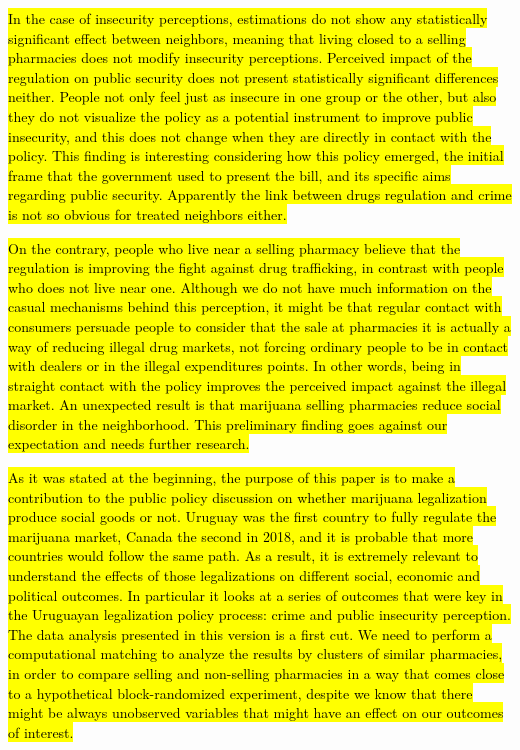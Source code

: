\documentclass[11pt]{article}
\begin{document}
\hl{In the case of insecurity perceptions, estimations do not show any statistically significant effect between neighbors, meaning that living closed to a selling pharmacies does not modify insecurity perceptions. Perceived impact of the regulation on public security does not present statistically significant differences neither. People not only feel just as insecure in one group or the other, but also they do not visualize the policy as a potential instrument to improve public insecurity, and this does not change when they are directly in contact with the policy. This finding is interesting considering how this policy emerged, the initial frame that the government used to present the bill, and its specific aims regarding public security. Apparently the link between drugs regulation and crime is not so obvious for treated neighbors either.}

\hl{On the contrary, people who live near a selling pharmacy believe that the regulation is improving the fight against drug trafficking, in contrast with people who does not live near one. Although we do not have much information on the casual mechanisms behind this perception, it might be that regular contact with consumers persuade people to consider that the sale at pharmacies it is actually a way of reducing illegal drug markets, not forcing ordinary people to be in contact with dealers or in the illegal expenditures points. In other words, being in straight contact with the policy improves the perceived impact against the illegal market. An unexpected result is that marijuana selling pharmacies reduce social disorder in the neighborhood. This preliminary finding goes against our expectation and needs further research.}

\hl{As it was stated at the beginning, the purpose of this paper is to make a contribution to the public policy discussion on whether marijuana legalization produce social goods or not. Uruguay was the first country to fully regulate the marijuana market, Canada the second in 2018, and it is probable that more countries would follow the same path. As a result, it is extremely relevant to understand the effects of those legalizations on different social, economic and political outcomes. In particular it looks at a series of outcomes that were key in the Uruguayan legalization policy process: crime and public insecurity perception. The data analysis presented in this version is a first cut. We need to perform a computational matching to analyze the results by clusters of similar pharmacies, in order to compare selling and non-selling pharmacies in a way that comes close to a hypothetical block-randomized experiment, despite we know that there might be always unobserved variables that might have an effect on our outcomes of interest.}
\end{document}
